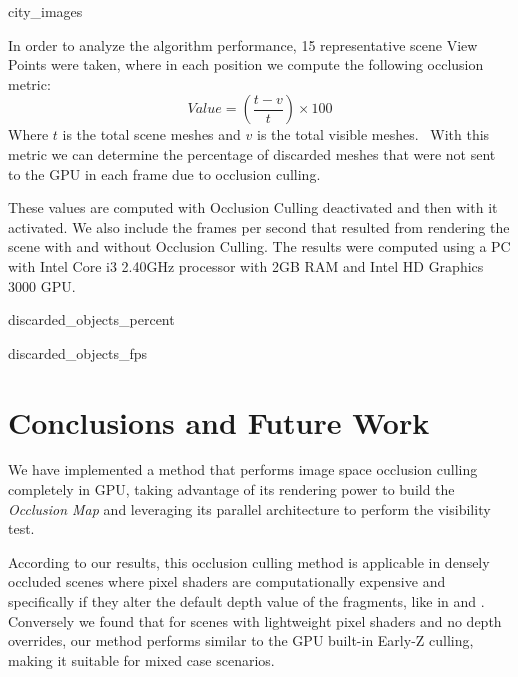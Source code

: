 \documentclass[10pt, conference]{IEEEtran}
\begin{document}
{city_images}{
%
}




In order to analyze the algorithm performance, 15 representative scene View Points were taken, where in each position we compute the following 
occlusion metric:
\[
	Value = (\frac{t - v}{t}) \times 100
\]
Where $t$ is the total scene meshes and $v$ is the total visible meshes. \
With this metric we can determine the percentage of discarded meshes that were not sent to the GPU in each frame due to occlusion culling.\

These values are computed with Occlusion Culling deactivated and then with it activated. 
We also include the frames per second that resulted from rendering the scene with and without Occlusion Culling. 
The results were computed using a PC with Intel Core i3 2.40GHz processor with 2GB RAM and Intel HD Graphics 3000 GPU.


{discarded_objects_percent}{
%
}

{discarded_objects_fps}{
%
}


\section{Conclusions and Future Work}
%
We have implemented a method that performs image space occlusion culling completely in GPU, taking advantage of its rendering power to 
build the \emph{Occlusion Map} and leveraging its parallel architecture to perform the visibility test.\

According to our results, this occlusion culling method is applicable in densely occluded scenes where pixel shaders are computationally 
expensive and specifically if they alter the default depth value of the fragments, like in \cite{z_correct_bump_1} and \cite{z_correct_bump_2}. 
Conversely we found that for scenes with lightweight pixel shaders and no depth overrides, our method performs similar to the GPU built-in Early-Z 
culling, making it suitable for mixed case scenarios.\
\end{document}

